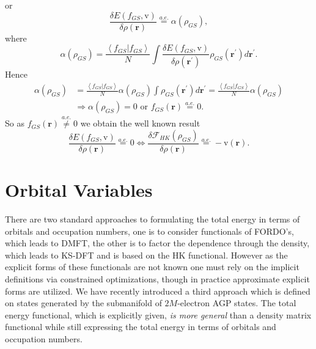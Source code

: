 \documentclass[aps,preprint]{revtex4}%
\begin{document}
or
\begin{equation}
\frac{\delta E\left(  f_{GS}\boldsymbol{,}\mathrm{v}\right)  }{\delta
\rho\left(  \boldsymbol{r}\right)  }\overset{a.e.}{=}\alpha\left(  \rho
_{GS}\right)  , \label{fmin}%
\end{equation}
where%
\begin{equation}
\alpha\left(  \rho_{GS}\right)  =\frac{\left\langle f_{GS}|f_{GS}\right\rangle
}{N}\int\frac{\delta E\left(  f_{GS}\boldsymbol{,}\mathrm{v}\right)  }%
{\delta\rho\left(  \boldsymbol{r}^{\prime}\right)  }\rho_{GS}\left(
\boldsymbol{r}^{\prime}\right)  d\boldsymbol{r}^{\prime}. \label{alpha}%
\end{equation}
Hence
\begin{align}
\alpha\left(  \rho_{GS}\right)   &  =\frac{\left\langle f_{GS}|f_{GS}%
\right\rangle }{N}\alpha\left(  \rho_{GS}\right)  \int\rho_{GS}\left(
\boldsymbol{r}^{\prime}\right)  d\boldsymbol{r}^{\prime}=\frac{\left\langle
f_{GS}|f_{GS}\right\rangle }{N}\alpha\left(  \rho_{GS}\right) \\
&  \Rightarrow\alpha\left(  \rho_{GS}\right)  =0\text{ or }f_{GS}\left(
\boldsymbol{r}\right)  \overset{a.e.}{=}0.
\end{align}
So as $f_{GS}\left(  \boldsymbol{r}\right)  \overset{a.e.}{\neq}0$ we obtain
the well known result
\begin{equation}
\frac{\delta E\left(  f_{GS}\boldsymbol{,}\mathrm{v}\right)  }{\delta
\rho\left(  \boldsymbol{r}\right)  }\overset{a.e.}{=}0\Leftrightarrow
\frac{\delta\mathcal{F}_{HK}\left(  \rho_{GS}\right)  }{\delta\rho\left(
\boldsymbol{r}\right)  }\overset{a.e.}{=}-\mathrm{v}\left(  \boldsymbol{r}%
\right)  .
\end{equation}


\section{Orbital Variables \label{GSO}}

There are two standard approaches to formulating the total energy in terms of
orbitals and occupation numbers, one is to consider functionals of FORDO's,
which leads to DMFT, the other is to factor the dependence through the
density, which leads to KS-DFT and is based on the HK functional. However as
the explicit forms of these functionals are not known one must rely on the
implicit definitions via constrained optimizations, though in practice
approximate explicit forms are utilized. We have recently
\cite{OrtizWeiner2006} introduced a third approach which is defined on states
generated by the submanifold of $2M$-electron AGP states. The total energy
functional, which is explicitly given, \emph{is more general }than a density
matrix functional while still expressing the total energy in terms of orbitals
and occupation numbers.
\end{document}
